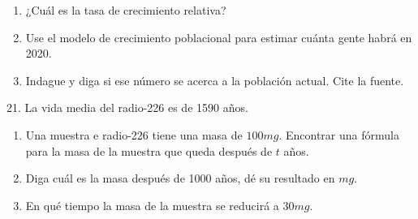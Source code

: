 \documentclass[12pt]{article}
\begin{document}
\begin{enumerate}[\hspace{9px} a)]
    \item ¿Cuál es la tasa de crecimiento relativa?
    
    \item Use el modelo de crecimiento poblacional para estimar cuánta gente habrá en 2020.
    
    \item Indague y diga si ese número se acerca a la población actual. Cite la fuente.

\end{enumerate}

21. La vida media del radio-226 es de 1590 años.

\begin{enumerate}[\hspace{9px} a)]
    \item Una muestra e radio-226 tiene una masa de $100mg$. Encontrar una fórmula para la masa de la muestra que queda después de $t$ años.
    
    \item Diga cuál es la masa después de 1000 años, dé su resultado en $mg$.
    
    \item En qué tiempo la masa de la muestra se reducirá a $30mg$.

\end{enumerate}
\end{document}
